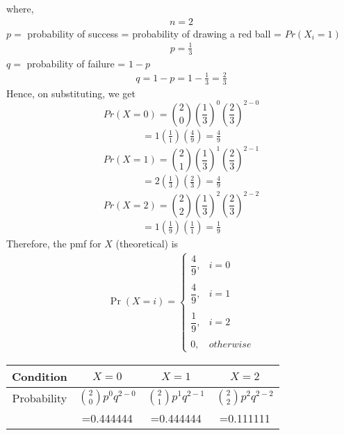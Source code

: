 \documentclass[journal,12pt,twocolumn]{IEEEtran}
\begin{document}
where,
\begin{align}
    \tag{5.25.8}
    n=2
\end{align}
\newline $p =$ probability of success = probability of drawing a red ball = $Pr(X_{i}=1)$
\begin{align}
    \tag{5.25.9}
    p=\frac{1}{3}
\end{align}
\newline $q =$ probability of failure = $1-p$
\begin{align}
    \tag{5.25.10}
    q=1-p=1-\frac{1}{3}=\frac{2}{3}
\end{align}
Hence, on substituting, we get
$$Pr(X=0)={2\choose 0}\left(\frac{1}{3}\right)^{0}\left(\frac{2}{3}\right)^{2-0}$$
\begin{align}
    \tag{5.25.11}
    =1\left(\frac{1}{1}\right)\left(\frac{4}{9}\right)=\frac{4}{9}
\end{align}
$$Pr(X=1)={2\choose 1}\left(\frac{1}{3}\right)^{1}\left(\frac{2}{3}\right)^{2-1}$$
\begin{align}     
    \tag{5.25.12}
    =2\left(\frac{1}{3}\right)\left(\frac{2}{3}\right)=\frac{4}{9}
\end{align}
$$Pr(X=2)={2\choose 2}\left(\frac{1}{3}\right)^{2}\left(\frac{2}{3}\right)^{2-2}$$
\begin{align}
     \tag{5.25.13}
    =1\left(\frac{1}{9}\right)\left(\frac{1}{1}\right)=\frac{1}{9}
\end{align}
Therefore, the pmf for $X$ (theoretical) is
\begin{align}
    \tag{5.25.14}
    \Pr(X=i) = 
	\begin{cases}
	\dfrac{4}{9}, & i=0 \\~\\[-1em]
	\dfrac{4}{9}, & i=1 \\~\\[-1em]
	\dfrac{1}{9}, & i=2 \\~\\[-1em]
	0, & otherwise
	\end{cases}
\end{align}
\newline
\newline
\begin{tabular}{|c|c|c|c|}
    \hline
    Condition & $X = 0$& $X =1 $& $X=2$ \\
    \hline
    Probability & ${2\choose 0}p^{0}q^{2-0}$ & ${2\choose 1}p^{1}q^{2-1}$ & ${2\choose 2}p^{2}q^{2-2}$\\
         & =0.444444 & =0.444444 & =0.111111\\
    \hline
\end{tabular}
\end{document}

